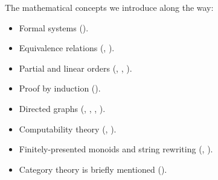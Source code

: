 \documentclass[../generics]{subfiles}
\begin{document}
The mathematical concepts we introduce along the way:
\begin{itemize}
\item Formal systems ().
\item Equivalence relations (, ).
\item Partial and linear orders (, , ).
\item Proof by induction ().
\item Directed graphs (, , , ).
\item Computability theory (, ).
\item Finitely-presented monoids and string rewriting (, ).
\item Category theory is briefly mentioned ().
\end{itemize}
\end{document}
